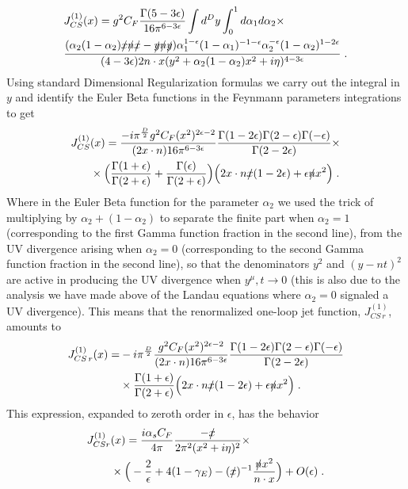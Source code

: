 \documentclass[%
 reprint,
 amsmath,amssymb,
 aps,
]{revtex4-1}
\begin{document}
\begin{align}
&J^{(1)}_{CS}(x)=g^2 C_F\frac{\Gamma(5-3\epsilon)}{16\pi^{6-3\epsilon}}\int d^D y\int_0^1 d\alpha_1d\alpha_2\nonumber\times\\
&\frac{(\alpha_2(1-\alpha_2)\slashed{x}\slashed{n}\slashed{x}-\slashed{y}\slashed{n}\slashed{y})\alpha_1^{1-\epsilon}(1-\alpha_1)^{-1-\epsilon}\alpha_2^{-\epsilon}(1-\alpha_2)^{1-2\epsilon}}{(4-3\epsilon) 2n\cdot x(y^2+\alpha_2(1-\alpha_2) x^2+i\eta)^{4-3\epsilon}}\;.
\end{align}
Using standard Dimensional Regularization formulas we carry out the integral in $y$ and identify the Euler Beta functions in the Feynmann parameters integrations to get
\begin{align}
J^{(1)}_{CS}&(x)=\frac{-i\pi^{\frac{D}{2}}g^2 C_F(x^2)^{2\epsilon-2}}{(2x\cdot n) 16\pi^{6-3\epsilon}}\frac{\Gamma(1-2\epsilon)\Gamma(2-\epsilon)\Gamma(-\epsilon)}{\Gamma(2-2\epsilon)}\times\nonumber\\
&\times\Big(\frac{\Gamma(1+\epsilon)}{\Gamma(2+\epsilon)}+\frac{\Gamma(\epsilon)}{\Gamma(2+\epsilon)}\Big)\Big(2x\cdot n \slashed{x}(1-2\epsilon)+\epsilon\slashed n x^2\Big)\;.
\end{align}
Where in the Euler Beta function for the parameter $\alpha_2$ we used the trick of multiplying by $\alpha_2+(1-\alpha_2)$ to separate the finite part when $\alpha_2=1$ (corresponding to the first Gamma function fraction in the second line), from the UV divergence arising when $\alpha_2=0$ (corresponding to the second Gamma function fraction in the second line), so that the denominators $y^2$ and $(y-nt)^2$ are active in producing the UV divergence when $y^\mu,t\to0$ (this is also due to the analysis we have made above of the Landau equations where $\alpha_2=0$ signaled a UV divergence). This means that the renormalized one-loop jet function, $J^{(1)}_{CS\,r}$, amounts to 
\begin{align}
J^{(1)}_{CS\,r}(x)=&-i\pi^{\frac{D}{2}}\frac{g^2 C_F(x^2)^{2\epsilon-2}}{(2x\cdot n) 16\pi^{6-3\epsilon}}\frac{\Gamma(1-2\epsilon)\Gamma(2-\epsilon)\Gamma(-\epsilon)}{\Gamma(2-2\epsilon)}\nonumber\\
&\times\frac{\Gamma(1+\epsilon)}{\Gamma(2+\epsilon)}\Big(2x\cdot n \slashed{x}(1-2\epsilon)+\epsilon\slashed n x^2\Big)\;.
\end{align}
This expression, expanded to zeroth order in $\epsilon$, has the behavior
\begin{align}
J^{(1)}_{CSr}&(x)=\frac{i \alpha_s C_F}{4\pi}\frac{-\slashed x}{2\pi^2(x^2+i\eta)^2}\times \nonumber\\
&\times\Big(-\frac{2}{\epsilon}+4(1- \gamma_E)-(\slashed x)^{-1}\frac{\slashed n x^2}{n\cdot x}\Big)+O(\epsilon)\;.
\end{align}
\end{document}
